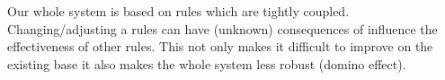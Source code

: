 \documentclass[12pt]{article}
\begin{document}

	
	Our whole system is based on rules which are tightly coupled. Changing/adjusting a rules can have (unknown) consequences of influence the effectiveness of other rules. This not only makes it difficult to improve on the existing base it also makes the whole system less robust (domino effect).
	
	
	\pagebreak
\end{document}

